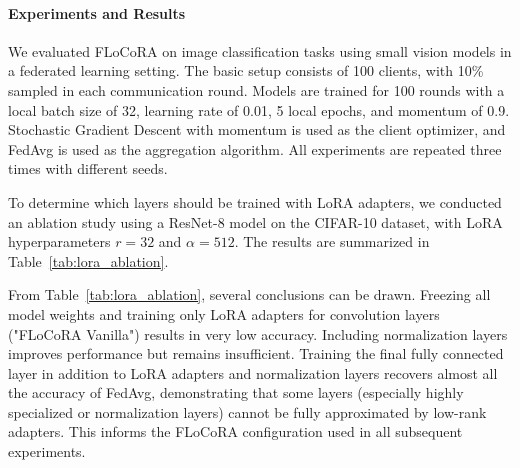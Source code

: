 \documentclass[11pt]{report}
\begin{document}
\paragraph{Experiments and Results}


We evaluated FLoCoRA on image classification tasks using small vision models in a federated learning setting. The basic setup consists of 100 clients, with 10\% sampled in each communication round. Models are trained for 100 rounds with a local batch size of 32, learning rate of 0.01, 5 local epochs, and momentum of 0.9. Stochastic Gradient Descent with momentum is used as the client optimizer, and FedAvg is used as the aggregation algorithm. All experiments are repeated three times with different seeds.


To determine which layers should be trained with LoRA adapters, we conducted an ablation study using a ResNet-8 model on the CIFAR-10 dataset, with LoRA hyperparameters $r=32$ and $\alpha=512$. The results are summarized in Table~\ref{tab:lora_ablation}.

\begin{table}[h]
  \centering
  \caption{Effect of training different layers with or without LoRA adapters on ResNet-8 for CIFAR-10.}
  \label{tab:lora_ablation}
  {\small{}}
\end{table}

From Table~\ref{tab:lora_ablation}, several conclusions can be drawn. Freezing all model weights and training only LoRA adapters for convolution layers ("FLoCoRA Vanilla") results in very low accuracy. Including normalization layers improves performance but remains insufficient. Training the final fully connected layer in addition to LoRA adapters and normalization layers recovers almost all the accuracy of FedAvg, demonstrating that some layers (especially highly specialized or normalization layers) cannot be fully approximated by low-rank adapters. This informs the FLoCoRA configuration used in all subsequent experiments.
\end{document}
